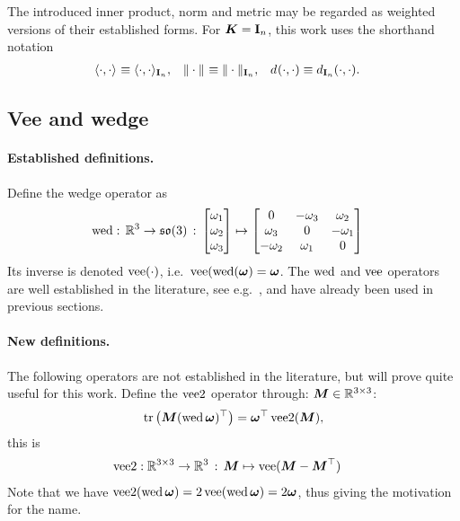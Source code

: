 The introduced inner product, norm and metric may be regarded as weighted versions of their established forms.
For $\mat{K} = \idMat[n]$, this work uses the shorthand notation
\begin{align}
 \sProd[]{\cdot}{\cdot} &\equiv \sProd[{\idMat[n]}]{\cdot}{\cdot},&
 \norm[]{\cdot} &\equiv \norm[{\idMat[n]}]{\cdot},&
 \metric[]{\cdot}{\cdot} &\equiv \metric[{\idMat[n]}]{\cdot}{\cdot}.
\end{align}


\subsection{Vee and wedge}
\paragraph{Established definitions.}
Define the wedge operator as
\begin{subequations}\label{eq:DefWedgeOpSO3}
\begin{align}
 \wedOp : \, \RealNum^3 \rightarrow \SpecialOrthogonalAlgebra(3) \, : \, \begin{bmatrix} \omega_1 \\ \omega_2 \\ \omega_3 \end{bmatrix} &\mapsto \begin{bmatrix} 0 & -\omega_3 & \omega_2 \\ \omega_3 & 0 & -\omega_1 \\ -\omega_2 & \omega_1 & 0 \end{bmatrix}
\end{align}
\end{subequations}
Its inverse is denoted $\veeOp(\cdot)$, i.e.\ $\veeOp(\wedOp(\w)=\w$.
The $\wedOp$ and $\veeOp$ operators are well established in the literature, see e.g.\ \cite[sec.\ 2.3.2]{Murray:Robotic}, and have already been used in previous sections.

\paragraph{New definitions.}
The following operators are not established in the literature, but will prove quite useful for this work.
Define the $\veeTwoOp$ operator through: $\mat{M}\in\RealNum^{3\times3}$:
\begin{align}\label{eq:EqVeeTwoOpSO3}
 \tr\big( \mat{M} (\wedOp\tuple{\omega})^\top \big) = \tuple{\omega}^\top \veeTwoOp(\mat{M}),
\end{align}
this is
\begin{align}
 \veeTwoOp &: \RealNum^{3\times 3} \rightarrow \RealNum^3 \, : \, \mat{M} \mapsto \veeOp(\mat{M}-\mat{M}^\top)
\end{align}
Note that we have $\veeTwoOp(\wedOp{\w}) = 2\veeOp(\wedOp{\w}) = 2\w$, thus giving the motivation for the name.

